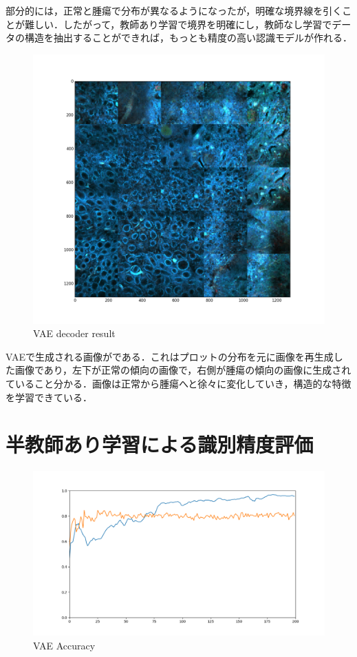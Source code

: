 部分的には，正常と腫瘍で分布が異なるようになったが，明確な境界線を引くことが難しい．したがって，教師あり学習で境界を明確にし，教師なし学習でデータの構造を抽出することができれば，もっとも精度の高い認識モデルが作れる．

\begin{figure}
	\centering
	\includegraphics[width=0.7\linewidth]{fig/chapter4/vae_result_picture}
	\caption{VAE decoder result}
	\label{fig:vaeresultpicture}
\end{figure}

VAEで生成される画像がである．これはプロットの分布を元に画像を再生成した画像であり，左下が正常の傾向の画像で，右側が腫瘍の傾向の画像に生成されていること分かる．画像は正常から腫瘍へと徐々に変化していき，構造的な特徴を学習できている．

\section{半教師あり学習による識別精度評価}

\begin{figure}[H]
	\centering
	\includegraphics[width=0.7\linewidth]{fig/chapter4/accuracy_summary}
	\caption{VAE Accuracy}
	\label{fig:accuracysummary}
\end{figure}

